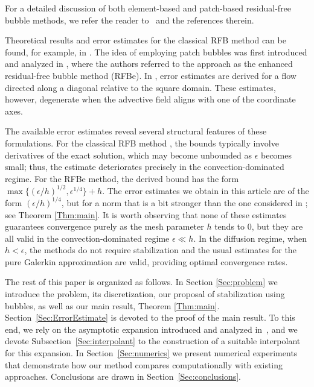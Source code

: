 \documentclass{article}
\begin{document}
For a detailed discussion of both element-based and patch-based residual-free bubble methods, we refer the reader to~\cite{BMZ} and the references therein.

Theoretical results and error estimates for the classical RFB method can be found, for example, in 
\cite{BFHR1997, Russo1997, Franca1998, Brezzi1999}. The idea of employing patch bubbles was first introduced and analyzed in \cite{Cangiani2005long,Cangiani2005short}, where the authors referred to the approach as the enhanced residual-free bubble method (RFBe). In \cite{Cangiani2005long}, error estimates are derived for a flow directed along a diagonal relative to the square domain. These estimates, however, degenerate when the advective field aligns with one of the coordinate axes.

The available error estimates reveal several structural features of these formulations. For the classical RFB method \cite[Thm. 4.2]{Brezzi1999}, the bounds typically involve derivatives of the exact solution, which may become unbounded as $\epsilon$ becomes small; thus, the estimate deteriorates precisely in the convection-dominated regime. For the RFBe method, the derived bound \cite[Thm. 2]{Cangiani2005long} has the form
 $\max\{(\epsilon/h)^{1/2},\epsilon^{1/4}\} + h$. The error estimates we obtain in this article are of the form $(\epsilon/h)^{1/4}$, but for a norm that is a bit stronger than the one considered in \cite[Thm. 2]{Cangiani2005long}; see Theorem \ref{Thm:main}.
It is worth observing that none of these estimates guarantees convergence purely as the mesh parameter $h$ tends to $0$, but they are all valid in the convection-dominated regime $\epsilon \ll h$. In the diffusion regime, when $h < \epsilon$, the methods do not require stabilization and the usual estimates for the pure Galerkin approximation are valid, providing optimal convergence rates.

The rest of this paper is organized as follows. In Section
\ref{Sec:problem} we introduce the problem, its discretization, our proposal of stabilization using bubbles,
as well as our main result, Theorem \ref{Thm:main}.
Section~\ref{Sec:ErrorEstimate} is devoted to the proof of the main result.
To this end, we rely on the asymptotic expansion introduced and analyzed in~\cite{GieEtAl:13}, and we devote Subsection~\ref{Sec:interpolant} to the construction of a suitable interpolant for this expansion.
In Section~\ref{Sec:numerics} we present numerical experiments that demonstrate how our method compares computationally with existing approaches.
Conclusions are drawn in Section~\ref{Sec:conclusions}.
\end{document}
